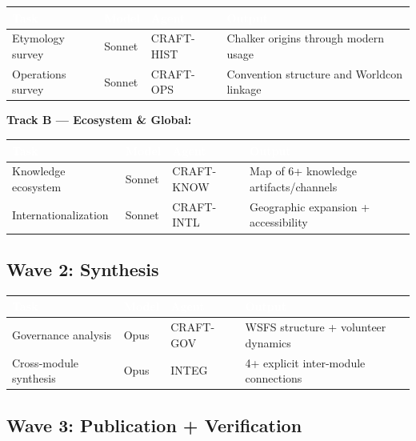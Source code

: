 \documentclass[11pt,letterpaper]{article}
\newcommand{\tableheader}[1]{\textbf{\sffamily\textcolor{white}{#1}}}
\begin{document}
\begin{center}
\begin{tabularx}{\textwidth}{L{2.5cm}C{1.5cm}C{2cm}X}
\toprule
{}
\tableheader{Task} & \tableheader{Model} & \tableheader{Agent} & \tableheader{Output} \\
\midrule
Etymology survey & Sonnet & CRAFT-HIST & Chalker origins through modern usage \\
Operations survey & Sonnet & CRAFT-OPS & Convention structure and Worldcon linkage \\
\bottomrule
\end{tabularx}
\end{center}

\textbf{Track B --- Ecosystem \& Global:}

\begin{center}
\begin{tabularx}{\textwidth}{L{2.5cm}C{1.5cm}C{2cm}X}
\toprule
{}
\tableheader{Task} & \tableheader{Model} & \tableheader{Agent} & \tableheader{Output} \\
\midrule
Knowledge ecosystem & Sonnet & CRAFT-KNOW & Map of 6+ knowledge artifacts/channels \\
Internationalization & Sonnet & CRAFT-INTL & Geographic expansion + accessibility \\
\bottomrule
\end{tabularx}
\end{center}

\subsection{Wave 2: Synthesis}

\begin{center}
\begin{tabularx}{\textwidth}{L{2.5cm}C{1.5cm}C{2cm}X}
\toprule
{}
\tableheader{Task} & \tableheader{Model} & \tableheader{Agent} & \tableheader{Output} \\
\midrule
Governance analysis & Opus & CRAFT-GOV & WSFS structure + volunteer dynamics \\
Cross-module synthesis & Opus & INTEG & 4+ explicit inter-module connections \\
\bottomrule
\end{tabularx}
\end{center}

\subsection{Wave 3: Publication + Verification}
\end{document}
